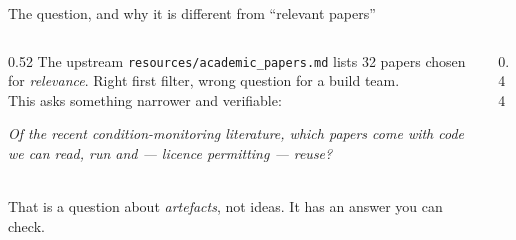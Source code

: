 \documentclass[aspectratio=169,10pt]{beamer}
\begin{document}
\begin{frame}{The question, and why it is different from ``relevant papers''}
  \begin{columns}[T]
    \begin{column}{0.52\textwidth}
      The upstream \texttt{resources/academic\_papers.md} lists 32 papers chosen
      for \emph{relevance}. Right first filter, wrong question for a build team.
      \\[2mm]
      This asks something narrower and verifiable:
      \\[1.5mm]
      \begin{minipage}{\linewidth}
        \noindent{\color{pdmrule}\rule{\linewidth}{0.4pt}}\par\vspace{1mm}
        {\small\itshape Of the recent condition-monitoring literature, which
        papers come with code we can read, run and --- licence permitting ---
        reuse?}\par
        \vspace{1mm}\noindent{\color{pdmrule}\rule{\linewidth}{0.4pt}}
      \end{minipage}
      \\[2.5mm]
      That is a question about \emph{artefacts}, not ideas. It has an answer you
      can check.
    \end{column}
    \begin{column}{0.44\textwidth}
      \centering
      \\[4mm]
    \end{column}
  \end{columns}
\end{frame}
\end{document}
